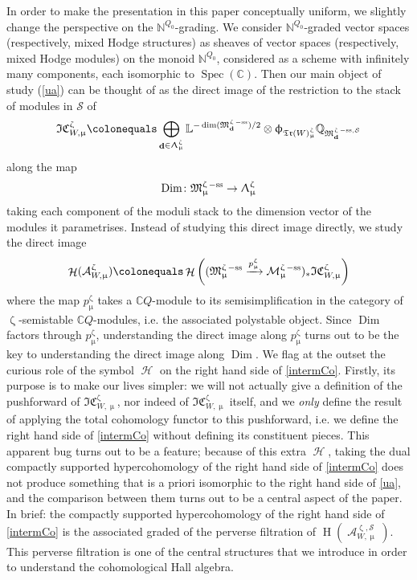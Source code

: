 \documentclass[a4paper,10pt]{amsart}
\renewcommand{\zeta}{\upzeta}
\renewcommand{\Lambda}{\Uplambda}
\renewcommand{\phi}{\upphi}
\renewcommand{\mu}{\upmu}
\newcommand{\LL}{\mathbb{L}}
\newcommand{\QQ}{\mathbb{Q}}
\newcommand{\SP}{\mathcal{S}}
\newcommand{\WWW}{\mathfrak{Tr}(W)}
\newcommand{\Mst}{\mathfrak{M}}
\newcommand{\Msp}{\mathcal{M}}
\newcommand{\ICSt}{\mathfrak{IC}}
\DeclareMathOperator{\sst}{-ss}
\DeclareMathOperator{\Dim}{\mathrm{Dim}}
\DeclareMathOperator{\dd}{\mathbf{d}}
\DeclareMathOperator{\Spec}{Spec}
\DeclareMathOperator{\Ho}{\mathcal{H}}
\DeclareMathOperator{\HO}{H}
\DeclareMathOperator{\Coha}{\mathcal{A}}
\begin{document}
\smallbreak
In order to make the presentation in this paper conceptually uniform, we slightly change the perspective on the $\mathbb{N}^{Q_0}$-grading.  We consider $\mathbb{N}^{Q_0}$-graded vector spaces (respectively, mixed Hodge structures) as sheaves of vector spaces (respectively, mixed Hodge modules) on the monoid $\mathbb{N}^{Q_0}$, considered as a scheme with infinitely many components, each isomorphic to $\Spec(\mathbb{C})$.  Then our main object of study (\ref{ua}) can be thought of as the direct image of the restriction to the stack of modules in $\SP$ of
\begin{equation}
\label{ICSTintro}
\ICSt_{W,\mu}^{\zeta}\colonequals \bigoplus_{\dd\in\Lambda_{\mu}^{\zeta}}\LL^{-\dim(\Mst_{\dd}^{\zeta\sst})/2}\otimes\phi_{\WWW^{\zeta}_{\mu}}\QQ_{\Mst^{\zeta\sst,\SP}_{\dd}}
\end{equation}
along the map
\[
\Dim\colon\Mst^{\zeta\sst}_{\mu}\rightarrow \Lambda_{\mu}^{\zeta}
\]
taking each component of the moduli stack to the dimension vector of the modules it parametrises.%
Instead of studying this direct image directly, we study the direct image
\begin{equation}
\label{intermCo}
\Ho(\mathcal{A}_{W,\mu}^{\zeta})\colonequals \Ho\left((\Mst^{\zeta\sst}_{\mu}\xrightarrow{p^{\zeta}_{\mu}}\Msp^{\zeta\sst}_{\mu})_*\ICSt_{W,\mu}^{\zeta}\right)
\end{equation}
where the map $p^{\zeta}_{\mu}$ takes a $\mathbb{C}Q$-module to its semisimplification in the category of $\zeta$-semistable $\mathbb{C}Q$-modules, i.e. the associated polystable object.  Since $\Dim$ factors through $p^{\zeta}_{\mu}$, understanding the direct image along $p^{\zeta}_{\mu}$ turns out to be the key to understanding the direct image along $\Dim$.
\smallbreak
We flag at the outset the curious role of the symbol $\Ho$ on the right hand side of \eqref{intermCo}.  Firstly, its purpose is to make our lives simpler: we will not actually give a definition of the pushforward of $\ICSt_{W,\mu}^{\zeta}$, nor indeed of $\ICSt_{W,\mu}^{\zeta}$ itself, and we \textit{only} define the result of applying the total cohomology functor to this pushforward, i.e. we define the right hand side of \eqref{intermCo} without defining its constituent pieces.  This apparent bug turns out to be a feature; because of this extra $\Ho$, taking the dual compactly supported hypercohomology of the right hand side of \eqref{intermCo} does not produce something that is a priori isomorphic to the right hand side of \eqref{ua}, and the comparison between them turns out to be a central aspect of the paper.  In brief: the compactly supported hypercohomology of the right hand side of \eqref{intermCo} is the associated graded of the perverse filtration of $\HO\left(\Coha_{W,\mu}^{\zeta,\SP}\right)$.  This perverse filtration is one of the central structures that we introduce in order to understand the cohomological Hall algebra. 
\end{document}
